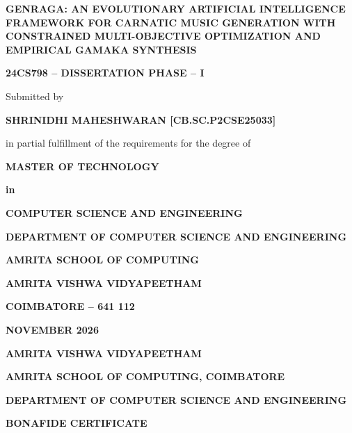 \documentclass[12pt,a4paper]{report}
\begin{document}
\begin{titlepage}
\begin{center}
\vspace*{0.2cm}
{\Large \bfseries GENRAGA: AN EVOLUTIONARY ARTIFICIAL INTELLIGENCE FRAMEWORK FOR CARNATIC MUSIC GENERATION WITH CONSTRAINED MULTI-OBJECTIVE OPTIMIZATION AND EMPIRICAL GAMAKA SYNTHESIS \par}
\vspace{1.5cm}
{\large \bfseries 24CS798 -- DISSERTATION PHASE -- I \par}
\vspace{1.2cm}
{\large Submitted by \par}
\vspace{0.4cm}
{\large \bfseries SHRINIDHI MAHESHWARAN [CB.SC.P2CSE25033] \par}
\vspace{1.2cm}
{\large in partial fulfillment of the requirements for the degree of \par}
\vspace{0.4cm}
{\large \bfseries MASTER OF TECHNOLOGY \par}
{\large \bfseries in \par}
{\large \bfseries COMPUTER SCIENCE AND ENGINEERING \par}
\vspace{1.8cm}
{\bfseries DEPARTMENT OF COMPUTER SCIENCE AND ENGINEERING \par}
{\bfseries AMRITA SCHOOL OF COMPUTING \par}
{\bfseries AMRITA VISHWA VIDYAPEETHAM \par}
{\bfseries COIMBATORE -- 641 112 \par}
\vspace{1.2cm}
{\large \bfseries NOVEMBER 2026 \par}
\end{center}
\end{titlepage}

\newpage
\thispagestyle{empty}
\begin{center}
{\Large \bfseries AMRITA VISHWA VIDYAPEETHAM \par}
{\bfseries AMRITA SCHOOL OF COMPUTING, COIMBATORE \par}
{\bfseries DEPARTMENT OF COMPUTER SCIENCE AND ENGINEERING \par}
\vspace{1.2cm}
{\large \bfseries BONAFIDE CERTIFICATE \par}
\end{center}
\vspace{0.8cm}
\end{document}
